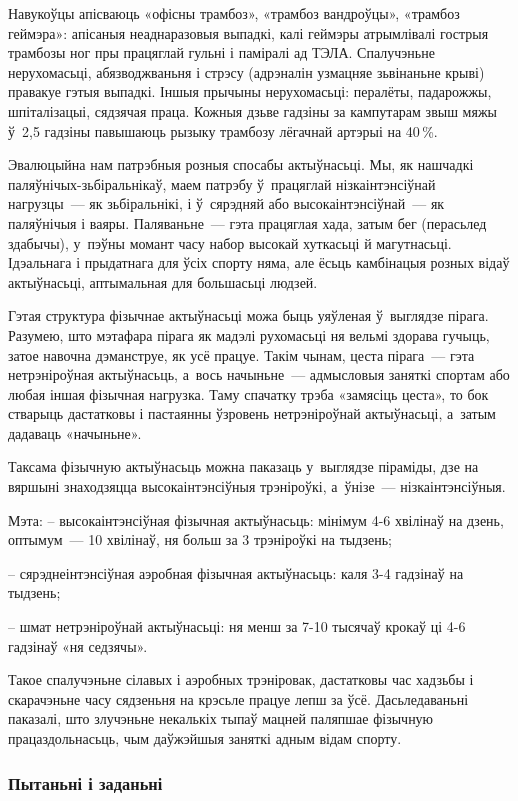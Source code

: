 Навукоўцы апісваюць «офісны трамбоз», «трамбоз вандроўцы», «трамбоз геймэра»: апісаныя неаднаразовыя выпадкі, калі геймэры атрымлівалі гострыя трамбозы ног пры працяглай гульні і паміралі ад ТЭЛА. Спалучэньне нерухомасьці, абязводжваньня і стрэсу (адрэналін узмацняе зьвінаньне крыві) правакуе гэтыя выпадкі. Іншыя прычыны нерухомасьці: пералёты, падарожжы, шпіталізацыі, сядзячая праца. Кожныя дзьве гадзіны за кампутарам звыш мяжы ў~2,5 гадзіны павышаюць рызыку трамбозу лёгачнай артэрыі на 40\,\%.

Эвалюцыйна нам патрэбныя розныя спосабы актыўнасьці. Мы, як нашчадкі паляўнічых-зьбіральнікаў, маем патрэбу ў~працяглай нізкаінтэнсіўнай нагрузцы~--- як зьбіральнікі, і ў~сярэдняй або высокаінтэнсіўнай~--- як паляўнічыя і ваяры. Паляваньне~--- гэта працяглая хада, затым бег (перасьлед здабычы), у~пэўны момант часу набор высокай хуткасьці й магутнасьці. Ідэальнага і прыдатнага для ўсіх спорту няма, але ёсьць камбінацыя розных відаў актыўнасьці, аптымальная для большасьці людзей.

Гэтая структура фізычнае актыўнасьці можа быць уяўленая ў~выглядзе пірага. Разумею, што мэтафара пірага як мадэлі рухомасьці ня вельмі здорава гучыць, затое навочна дэманструе, як усё працуе. Такім чынам, цеста пірага~--- гэта нетрэніроўная актыўнасьць, а~вось начыньне~--- адмысловыя заняткі спортам або любая іншая фізычная нагрузка. Таму спачатку трэба «замясіць цеста», то бок стварыць дастатковы і пастаянны ўзровень нетрэніроўнай актыўнасьці, а~затым дадаваць «начыньне».

Таксама фізычную актыўнасьць можна паказаць у~выглядзе піраміды, дзе на вяршыні знаходзяцца высокаінтэнсіўныя трэніроўкі, а~ўнізе~--- нізкаінтэнсіўныя.

Мэта:
– высокаінтэнсіўная фізычная актыўнасьць: мінімум 4-6 хвілінаў на дзень, оптымум~--- 10 хвілінаў, ня больш за 3 трэніроўкі на тыдзень; 

– сярэднеінтэнсіўная аэробная фізычная актыўнасьць: каля 3-4 гадзінаў на тыдзень;

– шмат нетрэніроўнай актыўнасьці: ня менш за 7-10 тысячаў крокаў ці 4-6 гадзінаў «ня седзячы».

Такое спалучэньне сілавых і аэробных трэніровак, дастатковы час хадзьбы і скарачэньне часу сядзеньня на крэсьле працуе лепш за ўсё. Дасьледаваньні паказалі, што злучэньне некалькіх тыпаў мацней паляпшае фізычную працаздольнасьць, чым даўжэйшыя заняткі адным відам спорту.

\subsubsection{Пытаньні і заданьні}

